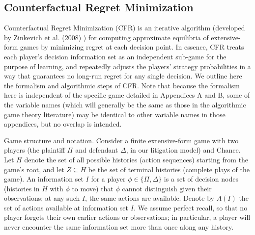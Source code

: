 \documentclass{article}
\begin{document}
\subsection{Counterfactual Regret Minimization}\label{app:CFR}

Counterfactual Regret Minimization (CFR) is an iterative algorithm (developed by Zinkevich et al. (2008) \cite{zinkevichetal}) for computing approximate equilibria of extensive-form games by minimizing regret at each decision point. In essence, CFR treats each player’s decision information set as an independent sub-game for the purpose of learning, and repeatedly adjusts the players’ strategy probabilities in a way that guarantees no long-run regret for any single decision. We outline here the formalism and algorithmic steps of CFR. Note that because the formalism here is independent of the specific game detailed in Appendices A and B, some of the variable names (which will generally be the same as those in the algorithmic game theory literature) may be identical to other variable names in those appendices, but no overlap is intended.

Game structure and notation. Consider a finite extensive-form game with two players (the plaintiff $\Pi$ and defendant $\Delta$, in our litigation model) and Chance. Let $H$ denote the set of all possible histories (action sequences) starting from the game’s root, and let $Z \subseteq H$ be the set of terminal histories (complete plays of the game). An information set $I$ for a player $\phi \in \{\Pi,\Delta\}$ is a set of decision nodes (histories in $H$ with $\phi$ to move) that $\phi$ cannot distinguish given their observations; at any such $I$, the same actions are available. Denote by $A(I)$ the set of actions available at information set $I$. We assume perfect recall, so that no player forgets their own earlier actions or observations; in particular, a player will never encounter the same information set more than once along any history.
\end{document}
